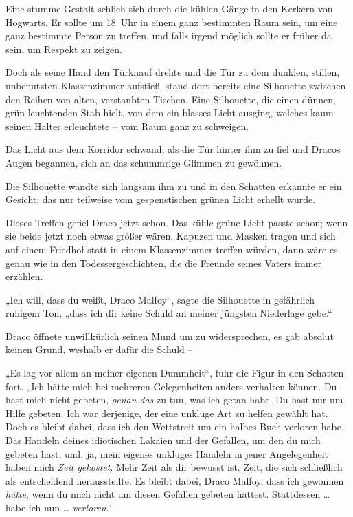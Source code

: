 \later 

Eine stumme Gestalt schlich sich durch die kühlen Gänge in den Kerkern von Hogwarts. Er sollte um 18~Uhr in einem ganz bestimmten Raum sein, um eine ganz bestimmte Person zu treffen, und falls irgend möglich sollte er früher da sein, um Respekt zu zeigen. 

Doch als seine Hand den Türknauf drehte und die Tür zu dem dunklen, stillen, unbenutzten Klassenzimmer aufstieß, stand dort bereits eine Silhouette zwischen den Reihen von alten, verstaubten Tischen. Eine Silhouette, die einen dünnen, grün leuchtenden Stab hielt, von dem ein blasses Licht ausging, welches kaum seinen Halter erleuchtete – vom Raum ganz zu schweigen. 

Das Licht aus dem Korridor schwand, als die Tür hinter ihm zu fiel und Dracos Augen begannen, sich an das schummrige Glimmen zu gewöhnen. 

Die Silhouette wandte sich langsam ihm zu und in den Schatten erkannte er ein Gesicht, das nur teilweise vom gespenstischen grünen Licht erhellt wurde. 

Dieses Treffen gefiel Draco jetzt schon. Das kühle grüne Licht passte schon; wenn sie beide jetzt noch etwas größer wären, Kapuzen und Masken tragen und sich auf einem Friedhof statt in einem Klassenzimmer treffen würden, dann wäre es genau wie in den Todessergeschichten, die die Freunde seines Vaters immer erzählen. 

„Ich will, dass du weißt, Draco Malfoy“, sagte die Silhouette in gefährlich ruhigem Ton, „dass ich dir keine Schuld an meiner jüngsten Niederlage gebe.“ 

Draco öffnete unwillkürlich seinen Mund um zu widersprechen, es gab absolut keinen Grund, weshalb er dafür die Schuld – 

„Es lag vor allem an meiner eigenen Dummheit“, fuhr die Figur in den Schatten fort. „Ich hätte mich bei mehreren Gelegenheiten anders verhalten können. Du hast mich nicht gebeten, \emph{genau das} zu tun, was ich getan habe. Du hast nur um Hilfe gebeten. Ich war derjenige, der eine unkluge Art zu helfen gewählt hat. Doch es bleibt dabei, dass ich den Wettstreit um ein halbes Buch verloren habe. Das Handeln deines idiotischen Lakaien und der Gefallen, um den du mich gebeten hast, und, ja, mein eigenes unkluges Handeln in jener Angelegenheit haben mich \emph{Zeit gekostet}. Mehr Zeit als dir bewusst ist. Zeit, die sich schließlich als entscheidend herausstellte. Es bleibt dabei, Draco Malfoy, dass ich gewonnen \emph{hätte}, wenn du mich nicht um diesen Gefallen gebeten hättest. Stattdessen … habe ich nun … \emph{verloren}.“ 

